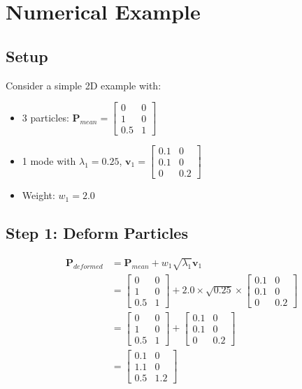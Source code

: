 \documentclass[12pt,a4paper]{article}
\begin{document}
\section{Numerical Example}

\subsection{Setup}

Consider a simple 2D example with:
\begin{itemize}
    \item 3 particles: $\mathbf{P}_{mean} = \begin{bmatrix} 0 & 0 \\ 1 & 0 \\ 0.5 & 1 \end{bmatrix}$
    \item 1 mode with $\lambda_1 = 0.25$, $\mathbf{v}_1 = \begin{bmatrix} 0.1 & 0 \\ 0.1 & 0 \\ 0 & 0.2 \end{bmatrix}$
    \item Weight: $w_1 = 2.0$
\end{itemize}

\subsection{Step 1: Deform Particles}

\begin{align}
\mathbf{P}_{deformed} &= \mathbf{P}_{mean} + w_1 \sqrt{\lambda_1} \mathbf{v}_1 \\
&= \begin{bmatrix} 0 & 0 \\ 1 & 0 \\ 0.5 & 1 \end{bmatrix} + 2.0 \times \sqrt{0.25} \times \begin{bmatrix} 0.1 & 0 \\ 0.1 & 0 \\ 0 & 0.2 \end{bmatrix} \\
&= \begin{bmatrix} 0 & 0 \\ 1 & 0 \\ 0.5 & 1 \end{bmatrix} + \begin{bmatrix} 0.1 & 0 \\ 0.1 & 0 \\ 0 & 0.2 \end{bmatrix} \\
&= \begin{bmatrix} 0.1 & 0 \\ 1.1 & 0 \\ 0.5 & 1.2 \end{bmatrix}
\end{align}
\end{document}
